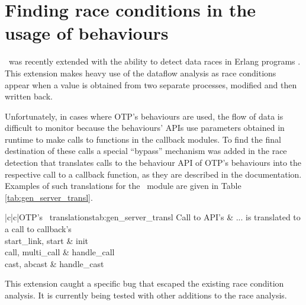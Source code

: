 \section{Finding race conditions in the usage of behaviours}

\dr\ was recently extended with the ability to detect data races in
Erlang programs \cite{Races@PADL-10}. This extension makes heavy use of the
dataflow analysis as race conditions appear when a value is obtained
from two separate processes, modified and then written
back.

Unfortunately, in cases where OTP's behaviours are used, the flow of
data is difficult to monitor because the behaviours' APIs use
parameters obtained in runtime to make calls to functions in the
callback modules. To find the final destination of these calls a
special ``bypass'' mechanism was added in the race detection that
translates calls to the behaviour API of OTP's behaviours into the
respective call to a callback function, as they are described in the
documentation. Examples of such translations for the \genserv\
module are given in Table \ref{tab:gen_server_transl}.

\begin{fulltable}{|c|c|}{OTP's \genserv\ translations}{tab:gen_server_transl}
\hline
Call to API's & ... is translated to a call to callback's\\
\hline
\hline
start\_link, start & init         \\
\hline
call, multi\_call  & handle\_call \\
\hline
cast, abcast       & handle\_cast \\
\hline
\end{fulltable}

This extension caught a specific bug that escaped the existing race
condition analysis. It is currently being tested with other additions
to the race analysis.
